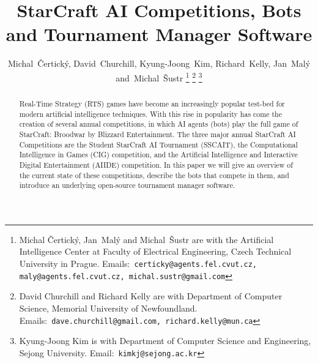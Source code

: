 \documentclass[journal]{IEEEtran}
\begin{document}
\title{StarCraft AI Competitions, Bots\\ and Tournament Manager Software}

\author{Michal~\v{C}ertick\'{y}, David~Churchill, Kyung-Joong~Kim, Richard~Kelly, Jan~Mal\'{y} and~Michal~\v{S}ustr%
\thanks{Michal \v{C}ertick\'{y}, Jan~Mal\'{y} and Michal~\v{S}ustr are with the Artificial Intelligence Center at Faculty of Electrical Engineering, Czech Technical University in Prague. Emails:~\tt{certicky@agents.fel.cvut.cz}, \tt{maly@agents.fel.cvut.cz}, \tt{michal.sustr@gmail.com}}%
\thanks{David Churchill and Richard Kelly are with Department of Computer Science, Memorial University of Newfoundland. Emails:~\tt{dave.churchill@gmail.com}, \tt{richard.kelly@mun.ca}}%
\thanks{Kyung-Joong Kim is with Department of Computer Science and Engineering, Sejong University. Email:~\tt{kimkj@sejong.ac.kr}}%
}

% 


\maketitle
\begin{abstract}
Real-Time Strategy (RTS) games have become an increasingly popular test-bed for modern artificial intelligence techniques. With this rise in popularity has come the creation of several annual competitions, in which AI agents (bots) play the full game of StarCraft: Broodwar by Blizzard Entertainment. The three major annual StarCraft AI Competitions are the Student StarCraft AI Tournament (SSCAIT), the Computational Intelligence in Games (CIG) competition, and the Artificial Intelligence and Interactive Digital Entertainment (AIIDE) competition. In this paper we will give an overview of the current state of these competitions, describe the bots that compete in them, and introduce an underlying open-source tournament manager software. 
\end{abstract}
\end{document}
